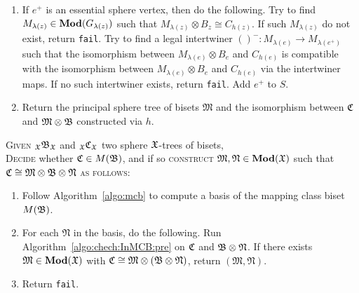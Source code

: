\documentclass{amsart}
\begin{document}
\begin{algo}
\begin{enumerate}
    intertwiner maps. If it does not exist, return
    \texttt{fail}.
  \item If $e^+$ is an essential sphere vertex, then do the
    following. Try to find $M_{\lambda(z)} \in \mathbf{\relax Mod}(G_{\lambda(z)})$
    such that $M_{\lambda(z)} \otimes B_z \cong C_{h(z)}$. If such
    $M_{\lambda(z)}$ do not exist, return \texttt{fail}. Try to find a
    legal intertwiner $()^-\colon M_{\lambda(e)}\to M_{\lambda(e^+)}$
    such that the isomorphism between $M_{\lambda(e)}\otimes B_{e}$
    and $C_{h(e)}$ is compatible with the isomorphism between
    $M_{\lambda(e)}\otimes B_{e}$ and $C_{h(e)}$ via the
    intertwiner maps. If no such
    intertwiner exists, return
    \texttt{fail}. Add $e^+$ to $S$. \label{algo:chech:InMCB:St6}
  \item Return the principal sphere tree of bisets $\mathfrak M$ and
    the isomorphism between ${\mathfrak C}$ and $\mathfrak M \otimes {\mathfrak B}$
    constructed via $h$.
  \end{enumerate}
\end{algo}

\begin{algo}\label{algo:chech:InMCB}
  \textsc{Given} $\subscript \gf\gfB_\gf$ and $\subscript \gf\gfC_\gf$
  two sphere ${\mathfrak X}$-trees of bisets,\\
  \textsc{Decide} whether ${\mathfrak C}\in M({\mathfrak B})$, and if so
  \textsc{construct} $\mathfrak M, \mathfrak N\in \mathbf{\relax Mod}({\mathfrak X})$
  such that ${\mathfrak C}\cong \mathfrak M \otimes {\mathfrak B} \otimes
  \mathfrak N$ \textsc{as follows:}\\\upshape
  \begin{enumerate}
  \item Follow Algorithm~\ref{algo:mcb} to compute a basis of the
    mapping class biset $M({\mathfrak B})$.
  \item For each $\mathfrak N$ in the basis, do the following. Run
    Algorithm~\ref{algo:chech:InMCB:pre} on ${\mathfrak C}$ and
    ${\mathfrak B}\otimes\mathfrak N$. If there exists
    $\mathfrak M\in\mathbf{\relax Mod}({\mathfrak X})$ with
    ${\mathfrak C}\cong\mathfrak M\otimes(\mathfrak B\otimes\mathfrak N)$,
    return $(\mathfrak M,\mathfrak N)$.
  \item Return \texttt{fail}.
  \end{enumerate}
\end{algo}
\end{document}
